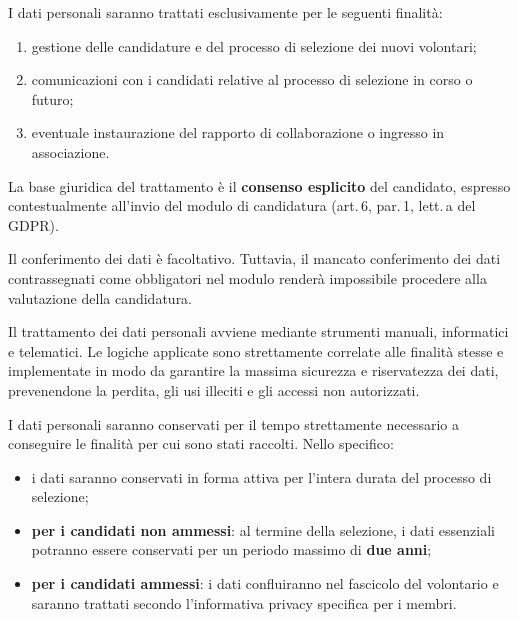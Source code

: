 \documentclass[legal]{core/polinetwork}
\begin{document}

I dati personali saranno trattati esclusivamente per le seguenti
finalità:

\begin{enumerate}
  \item gestione delle candidature e del processo di selezione dei
    nuovi volontari;
  \item comunicazioni con i candidati relative al processo di
    selezione in corso o futuro;
  \item eventuale instaurazione del rapporto di collaborazione o
    ingresso in associazione.
\end{enumerate}

La base giuridica del trattamento è il \textbf{consenso esplicito}
del candidato, espresso contestualmente all'invio del modulo di
candidatura (art.\,6, par.\,1, lett.\,a del GDPR).

Il conferimento dei dati è facoltativo. Tuttavia, il mancato
conferimento dei dati contrassegnati come obbligatori nel modulo
renderà impossibile procedere alla valutazione della candidatura.


Il trattamento dei dati personali avviene mediante strumenti manuali,
informatici e telematici. Le logiche applicate sono strettamente
correlate alle finalità stesse e implementate in modo da garantire
la massima sicurezza e riservatezza dei dati, prevenendone la perdita,
gli usi illeciti e gli accessi non autorizzati.


I dati personali saranno conservati per il tempo strettamente
necessario a conseguire le finalità per cui sono stati raccolti.
Nello specifico:

\begin{itemize}
  \item i dati saranno conservati in forma attiva per l'intera
    durata del processo di selezione;
  \item \textbf{per i candidati non ammessi}: al termine della
    selezione, i dati essenziali potranno essere conservati per
    un periodo massimo di \textbf{due anni};
  \item \textbf{per i candidati ammessi}: i dati confluiranno
    nel fascicolo del volontario e saranno trattati secondo
    l'informativa privacy specifica per i membri.
\end{itemize}
\end{document}
